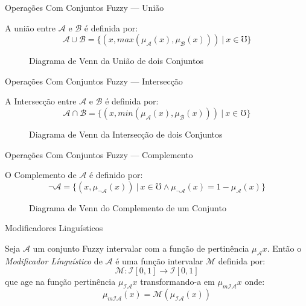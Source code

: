 \documentclass[portuges]{beamer}
\begin{document}
\begin{frame}{Operações Com Conjuntos Fuzzy --- União}

	\begin{definition}[União]
	A união entre $\mathcal{A}$ e $\mathcal{B}$ é definida por:
	$$	
	\mathcal{A} \cup \mathcal{B} = \{ ( x , max(\mu_\mathcal{A}(x),\mu_\mathcal{B}(x)))\ \vert\ x \in \mho \} 
	$$
	\end{definition}	
\begin{figure}
			\centering
			\caption{Diagrama de Venn da União de dois Conjuntos}
	\end{figure}	
\end{frame}

\begin{frame}{Operações Com Conjuntos Fuzzy --- Intersecção}

	\begin{definition}[Intersecção]
	A Intersecção entre $\mathcal{A}$ e $\mathcal{B}$ é definida por:
	$$	
	\mathcal{A} \cap \mathcal{B} = \{ ( x , min(\mu_\mathcal{A}(x),\mu_\mathcal{B}(x)))\ \vert\ x \in \mho \} 
	$$
	\end{definition}	
\begin{figure}
			\centering
			\caption{Diagrama de Venn da Intersecção de dois Conjuntos}
	\end{figure}	
\end{frame}

\begin{frame}{Operações Com Conjuntos Fuzzy --- Complemento}

	\begin{definition}[Complemento]
	O Complemento de $\mathcal{A}$ é definido por:
	$$	
	\lnot\mathcal{A} = \{ ( x , \mu_{\lnot\mathcal{A}}(x) )\ \vert\ x \in \mho \land \mu_{\lnot\mathcal{A}}(x) = 1 - \mu_{\mathcal{A}}(x) \} 
	$$
	\end{definition}	
\begin{figure}
			\centering
			\caption{Diagrama de Venn do Complemento de um Conjunto}
	\end{figure}	
\end{frame}

\begin{frame}{Modificadores Linguísticos}
	\begin{definition}
		Seja $\mathcal{A}$ um conjunto Fuzzy intervalar com a função de pertinência $\mu_\mathcal{A}{x}$.
		Então o \emph{Modificador Línguístico} de $\mathcal{A}$ é uma função intervalar $\mathcal{M}$ definida por:
		$$\mathcal{M}:\mathcal{I}[0,1] \to \mathcal{I}[0,1] $$
		que age na função pertinência $\mu_{\mathcal{I}\mathcal{A}}{x}$ transformando-a em $\mu_{m\mathcal{I}\mathcal{A}}{x}$ onde:
		$$\mu_{m\mathcal{I}\mathcal{A}}(x) = \mathcal{M}(\mu_{\mathcal{I}\mathcal{A}}(x))$$
	\end{definition}
\end{frame}
\end{document}
